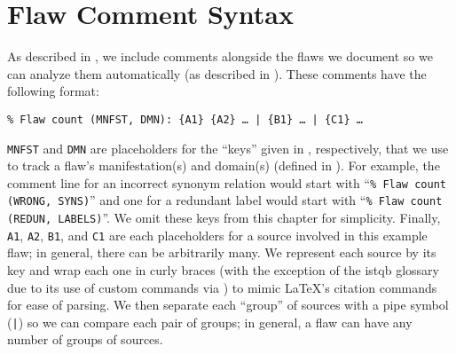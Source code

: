 \section{Flaw Comment Syntax}\label{flaw-comment-syntax}
As described in , we include comments alongside the flaws we
document so we can analyze them automatically (as described in
). These comments have the following format:
\begin{displayquote}
    \texttt{\% Flaw count (MNFST, DMN): \{A1\} \{A2\} \dots{} | \{B1\} %
        \dots{} | \{C1\} \dots}
\end{displayquote}
\texttt{MNFST} and \texttt{DMN} are placeholders for the ``keys'' given in
, respectively, that we use to
track a flaw's manifestation(s) and domain(s) (defined in ).
For example, the comment line for an incorrect synonym relation would start
with ``\texttt{\% Flaw count (WRONG, SYNS)}'' and one for a redundant label would
start with ``\texttt{\% Flaw count (REDUN, LABELS)}''. We omit these keys from
this chapter for simplicity. Finally, \texttt{A1}, \texttt{A2}, %
\texttt{B1}, and \texttt{C1} are each placeholders for a source involved in
this example flaw; in general, there can be arbitrarily many. We represent
each source by its \BibTeX{} key and wrap each one in curly braces (with
the exception of the \acs{istqb} glossary due to its use of custom commands
via ) to mimic \LaTeX{}'s citation commands for ease of
parsing. We then separate each ``group'' of sources with a pipe symbol
(\texttt{|}) so we can compare each pair of groups; in general, a flaw can
have any number of groups of sources.

